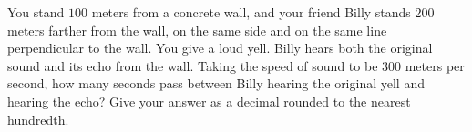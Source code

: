 You stand $100$ meters from a concrete wall, and your friend Billy stands $200$ meters farther from the wall, on the same side and on the same line perpendicular to the wall. You give a loud yell. Billy hears both the original sound and its echo from the wall. Taking the speed of sound to be $300$ meters per second, how many seconds pass between Billy hearing the original yell and hearing the echo? Give your answer as a decimal rounded to the nearest hundredth.
